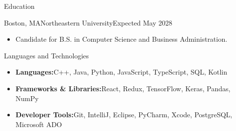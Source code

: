 \documentclass[]{mcdowellcv}
\begin{document}
	\makeheader
	\begin{cvsection}{Education}
		\begin{cvsubsection}{Boston, MA}{Northeastern University}{Expected May 2028}
			\begin{itemize}
				\item Candidate for B.S. in Computer Science and Business Administration.
			\end{itemize}
		\end{cvsubsection}
	\end{cvsection}
		\begin{cvsection}{Languages and Technologies}
		\begin{cvsubsection}{}{}{}	
			\begin{itemize}
				\item \textbf{Languages:}C++, Java, Python, JavaScript, TypeScript, SQL, Kotlin
				\item \textbf{Frameworks \& Libraries:}React, Redux, TensorFlow, Keras, Pandas, NumPy
				\item \textbf{Developer Tools:}Git, IntelliJ, Eclipse, PyCharm, Xcode, PostgreSQL, Microsoft ADO
			\end{itemize}
		\end{cvsubsection}
	\end{cvsection}
\end{document}
